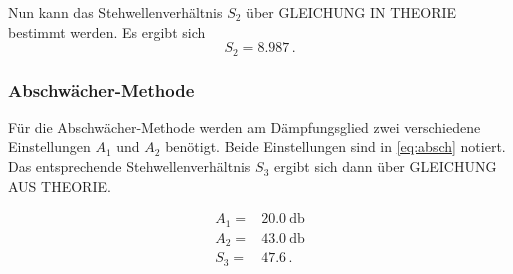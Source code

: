 Nun kann das Stehwellenverhältnis $S_2$ über GLEICHUNG IN THEORIE bestimmt werden.
Es ergibt sich
\begin{equation*}
    S_2 = 8.987 \, .
\end{equation*}

\subsubsection{Abschwächer-Methode}
\label{sssec:a7}

Für die Abschwächer-Methode werden am Dämpfungsglied zwei verschiedene Einstellungen $A_1$ und $A_2$ benötigt.
Beide Einstellungen sind in \autoref{eq:absch} notiert. 
Das entsprechende Stehwellenverhältnis $S_3$ ergibt sich dann über GLEICHUNG AUS THEORIE.

\begin{align}
    A_1 =& \SI{20.0}{\decibel} \\
    A_2 =& \SI{43.0}{\decibel} \\
    S_3 =& 47.6 \, .
    \label{eq:absch}
\end{align}